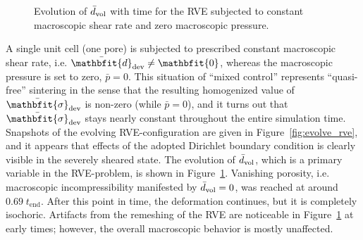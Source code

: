 \documentclass[10pt,a4paper,fleqn]{article}
\renewcommand{\ts}[1]{\mathbfit{#1}}
\newcommand{\figref}[1]{Figure~\ref{#1}}
\begin{document}
%
\begin{figure}[thpb!]
  \centering
  \caption{Evolution of $\bar{d}_{\mathrm{vol}}$ with time for the RVE subjected to constant macroscopic shear rate and zero macroscopic pressure.}
  \label{fig:evolve_graph}
\end{figure}


A single unit cell (one pore) is subjected to prescribed constant macroscopic shear rate, i.e. $\bar{\ts d}_\dev\neq \ts 0$, whereas the macroscopic pressure is set to zero, $\bar{p}=0$. This situation of ``mixed control'' represents ``quasi-free'' sintering in the sense that the resulting homogenized value of $\bar{\ts\sigma}_\dev$ is non-zero (while $\bar p = 0 $), and it turns out that $\bar{\ts\sigma}_\dev$ stays nearly constant throughout the entire simulation time.
Snapshots of the evolving RVE-configuration are given in \figref{fig:evolve_rve}, and it appears that effects of the adopted Dirichlet boundary condition is clearly visible in the severely sheared state.
The evolution of $\bar d_{\mathrm{vol}}$, which is a primary variable in the RVE-problem, is shown in \figref{fig:evolve_graph}.
Vanishing porosity, i.e. macroscopic incompressibility manifested by $\bar d_{\mathrm{vol}} = 0$, was reached at around $0.69\;t_{\mathrm{end}}$.
After this point in time, the deformation continues, but it is completely isochoric.
Artifacts from the remeshing of the RVE are noticeable in \figref{fig:evolve_graph} at early times; however, the overall macroscopic behavior is mostly unaffected.
\end{document}
